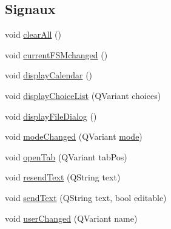 \subsection*{Signaux}
\begin{DoxyCompactItemize}
\item 
void \hyperlink{classSH__ApplicationCore_ab03fe18921573a2566d587189173f691}{clear\-All} ()
\item 
void \hyperlink{classSH__ApplicationCore_aac0f404ccc6443d1ddaf9b25dda14416}{current\-F\-S\-Mchanged} ()
\item 
void \hyperlink{classSH__ApplicationCore_acb00dec6d5cc096ca99e8d0235dd8095}{display\-Calendar} ()
\item 
void \hyperlink{classSH__ApplicationCore_a9e5a18f183d1e2999f86eb9f7fad0d80}{display\-Choice\-List} (Q\-Variant choices)
\item 
void \hyperlink{classSH__ApplicationCore_ab69844843adf0044efc0810b1772ce5a}{display\-File\-Dialog} ()
\item 
void \hyperlink{classSH__ApplicationCore_ad9ef4e541ba77120b8f1b5f71bbfe717}{mode\-Changed} (Q\-Variant \hyperlink{classSH__ApplicationCore_a5d9ecb0e578e78d84591e36dccdf3d07}{mode})
\item 
void \hyperlink{classSH__ApplicationCore_a1ca7706a2414bcfba6d529f0216dec8f}{open\-Tab} (Q\-Variant tab\-Pos)
\item 
void \hyperlink{classSH__ApplicationCore_a83dbcb859d0d31a6487086150e430d6b}{resend\-Text} (Q\-String text)
\item 
void \hyperlink{classSH__ApplicationCore_ab13d32ef84d080424469c6cecc0bf4c8}{send\-Text} (Q\-String text, bool editable)
\item 
void \hyperlink{classSH__ApplicationCore_aeeac6cde618cb677218d72c4ea7ecf18}{user\-Changed} (Q\-Variant name)
\end{DoxyCompactItemize}

